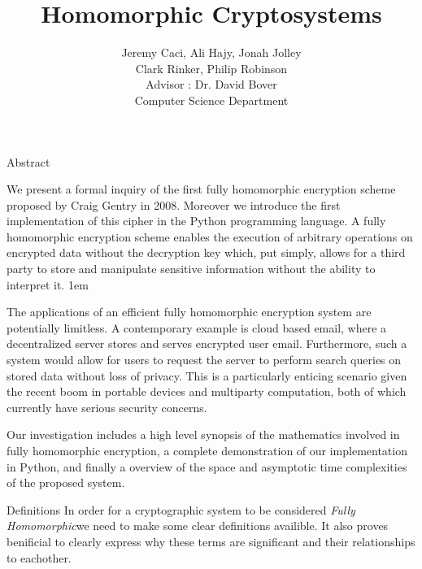 \documentclass[a0,portrait]{a0poster}
\title{Homomorphic Cryptosystems}
\author{
Jeremy Caci, Ali Hajy, Jonah Jolley\\
Clark Rinker, Philip Robinson\\
Advisor : Dr. David Bover\\
Computer Science Department
}
\begin{document}
\maketitle

\def\fh{{\em Fully Homomorphic\xspace}}

\begin{multicols}{2}
\begin{slide}{Abstract}

We present a formal inquiry of the first fully homomorphic encryption scheme proposed by Craig Gentry in 2008. Moreover we introduce the first implementation of this cipher in the Python programming language. A fully homomorphic encryption scheme enables the execution of arbitrary operations on encrypted data without the decryption key which, put simply, allows for a third party to  store and manipulate sensitive information without the ability to interpret it. 
\parskip 1em

The applications of an efficient fully homomorphic encryption system are potentially limitless. A contemporary example is cloud based email, where a decentralized server stores and serves encrypted user email. Furthermore, such a system would allow for users to request the server to perform search queries on stored data without loss of privacy. This is a particularly enticing scenario given the recent boom in portable devices and multiparty computation, both of which currently have serious security concerns. 

Our investigation includes a high level synopsis of the mathematics involved in fully homomorphic encryption, a complete demonstration of our implementation in Python, and finally a overview of the space and asymptotic time complexities of the proposed system. 

\end{slide}

\begin{slide}{Definitions}
In order for a cryptographic system to be considered \fh we need to make some clear definitions availible. It also proves benificial to clearly express why these terms are significant and their relationships to eachother. 


\end{slide}
\end{multicols}
\end{document}
